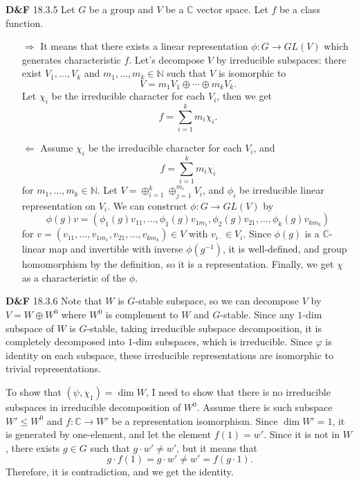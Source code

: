 \documentclass[a4paper, 12pt]{article}
\theoremstyle{Mydefinition}
\theoremstyle{Mytheorem}
\begin{document}
\noindent \textbf{D\&F} 18.3.5
Let $G$ be a group and $V$ be a $\mathbb{C}$ vector space. Let $f$ be a class function.

\begin{enumerate}
    \item[$\Rightarrow$] It means that there exists a linear representation $\phi:G\rightarrow GL(V)$ which generates characteristic $f$. Let's decompose $V$ by irreducible subspaces: there exist $V_1, \ldots, V_k$ and $m_1, \ldots, m_k\in \mathbb{N}$ such that $V$ is isomorphic to
    \begin{equation}
        V = m_1V_1\oplus \cdots \oplus m_k V_k.
    \end{equation}
    Let $\chi_i$ be the irreducible character for each $V_i$, then we get
    \begin{equation}
        f = \sum_{i=1}^k m_i \chi_i.
    \end{equation}
    \item[$\Leftarrow$] Assume $\chi_i$ be the irreducible character for each $V_i$, and
    \begin{equation}
        f = \sum_{i=1}^k m_i \chi_i
    \end{equation}
    for $m_1, \ldots, m_k\in \mathbb{N}$. Let $V=\oplus_{i=1}^k \oplus_{j=1}^{m_i} V_i$, and $\phi_i$ be irreducible linear representation on $V_i$. We can construct $\phi:G\rightarrow GL(V)$ by
    \begin{equation}
        \phi(g)v = \left(\phi_1(g)v_{11}, \ldots, \phi_1(g)v_{1m_1}, \phi_2(g)v_{21}, \ldots, \phi_k(g)v_{km_k}\right)
    \end{equation}
    for $v = (v_{11}, \ldots, v_{1m_1}, v_{21}, \ldots, v_{km_k})\in V$ with $v_{i\cdot}\in V_i$. Since $\phi(g)$ is a $\mathbb{C}$-linear map and invertible with inverse $\phi(g^{-1})$, it is well-defined, and group homomorphism by the definition, so it is a representation. Finally, we get $\chi$ as a characteristic of the $\phi$.
\end{enumerate}

\noindent \textbf{D\&F} 18.3.6
Note that $W$ is $G$-stable subspace, so we can decompose $V$ by $V=W\oplus W^0$ where $W^0$ is complement to $W$ and $G$-stable. Since any $1$-dim subspace of $W$ is $G$-stable, taking irreducible subspace decomposition, it is completely decomposed into $1$-dim subspaces, which is irreducible. Since $\varphi$ is identity on each subspace, these irreducible representations are isomorphic to trivial representations.

To show that $(\psi, \chi_1)=\dim W$, I need to show that there is no irreducible subspaces in irreducible decomposition of $W^0$. Assume there is such subspace $W'\leq W^0$ and $f:\mathbb{C}\rightarrow W'$ be a representation isomorphism. Since $\dim W' = 1$, it is generated by one-element, and let the element $f(1) = w'$. Since it is not in $W$, there exists $g\in G$ such that $g\cdot w'\neq w'$, but it means that
\begin{equation}
    g\cdot f(1) = g\cdot w'\neq  w' = f(g\cdot 1).
\end{equation}
Therefore, it is contradiction, and we get the identity.\\
\end{document}
